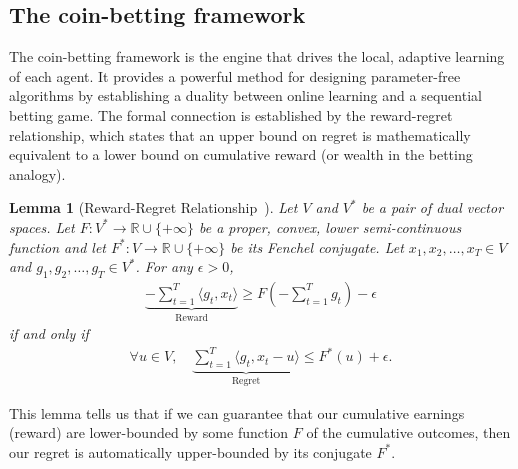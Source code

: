 \documentclass[journal]{IEEEtran}
\newtheorem{lemma}{Lemma}
\newcommand{\br}[1]{\left(#1\right)}
\begin{document}
\subsection{The coin-betting framework}
The coin-betting framework is the engine that drives the local, adaptive learning of each agent.
It provides a powerful method for designing parameter-free algorithms by establishing a duality between online learning and a sequential betting game.
The formal connection is established by the reward-regret relationship, which states that an upper bound on regret is mathematically equivalent to a lower bound on cumulative reward (or wealth in the betting analogy).

    {\color{blue}
        \begin{lemma}[Reward-Regret Relationship~\cite{mcmahan_unconstrained_2014}]\label{lemma:reward-regret}
            Let $V$ and $V^*$ be a pair of dual vector spaces.
            Let $F: V^* \to \mathbb{R} \cup \{+\infty\}$ be a proper, convex, lower semi-continuous function and let $F^*: V \to \mathbb{R} \cup \{+\infty\}$ be its Fenchel conjugate.
            Let $x_1, x_2, \dots, x_T \in V$ and $g_1, g_2, \dots, g_T \in V^*$.
            For any $\epsilon > 0$,
            \begin{align}
                \underbrace{-\sum_{t=1}^T \langle g_t, x_t \rangle}_{\text{Reward}} \geq F\br{-\sum_{t=1}^T g_t } - \epsilon
            \end{align}
            if and only if
            \begin{align}
                \forall u \in V, \quad \underbrace{\sum_{t=1}^T \langle g_t, x_t - u \rangle}_{\text{Regret}} \leq F^*(u) + \epsilon.
            \end{align}
        \end{lemma}
    }
This lemma tells us that if we can guarantee that our cumulative earnings (reward) are lower-bounded by some function $F$ of the cumulative outcomes, then our regret is automatically upper-bounded by its conjugate $F^*$.
\end{document}
